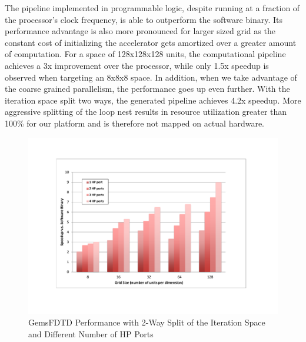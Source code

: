 The pipeline implemented in programmable logic, despite running at a fraction of
the processor's clock frequency, is able to outperform the software binary. Its performance advantage is also more pronounced for larger sized grid as the constant cost of initializing the accelerator gets amortized over a greater amount of computation. For a space of 128x128x128 units, the computational pipeline achieves a 3x improvement over the processor, while only 1.5x speedup is observed when targeting an 8x8x8 space. In addition, when we take advantage of the coarse grained parallelism, the performance goes up even further. With the iteration space split two ways, the generated pipeline achieves 4.2x speedup. More aggressive splitting of the loop nest results in resource utilization greater than 100\% for our platform and is therefore not mapped on actual hardware.


\begin{figure}[htp]
\begin{center}
\includegraphics[width=1.0\linewidth]{chap6fig/fdtdHP.pdf}
\caption{GemsFDTD Performance with 2-Way Split of the Iteration Space and Different Number of HP Ports
\label{fig:fdtdHp}}
\end{center}
\end{figure}

